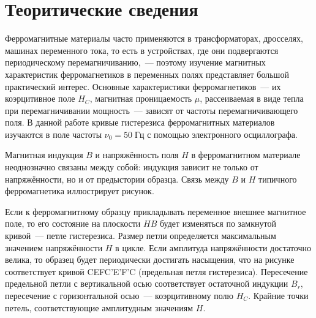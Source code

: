 \section{Теоритические сведения}
Ферромагнитные материалы часто применяются в трансформаторах, дросселях, машинах переменного тока, то есть в устройствах, где
они подвергаются периодическому перемагничиванию,~---
 поэтому изучение магнитных характеристик ферромагнетиков в переменных полях
 представляет большой практический интерес. Основные характеристики
 ферромагнетиков~--- их коэрцитивное поле $H_{C}$, магнитная проницаемость
 $\mu$, рассеиваемая в виде тепла при перемагничивании мощность~--- 
 зависят от частоты перемагничивающего поля. В данной работе кривые гистерезиса ферромагнитных материалов изучаются в поле частоты $ \nu_{0} = 50\;\text{Гц}$ с помощью электронного осциллографа.

 \begin{figure}[ht!]
 \end{figure}
 
 Магнитная индукция $B$ и напряжённость поля $H$ в ферромагнитном материале неоднозначно связаны между собой: индукция зависит
 не только от напряжённости, но и от предыстории образца. Связь между $B$ и $H$ типичного ферромагнетика иллюстрирует рисунок.

Если к ферромагнитному образцу прикладывать переменное внешнее
магнитное поле, то его состояние на плоскости $HB$ будет изменяться
по замкнутой кривой~--- петле гистерезиса. Размер петли определяется
максимальным значением напряжённости $H$ в цикле.
Если амплитуда напряжённости достаточно велика, то образец будет периодически достигать насыщения,
что на рисунке соответствует кривой  CEFC'E'F'C  (предельная петля
гистерезиса). Пересечение предельной петли с вертикальной осью соответствует остаточной индукции $B_{r}$,  пересечение с горизонтальной осью~--- коэрцитивному полю $H_{C}$.
 Крайние точки петель, соответствующие амплитудным значениям $H$.

